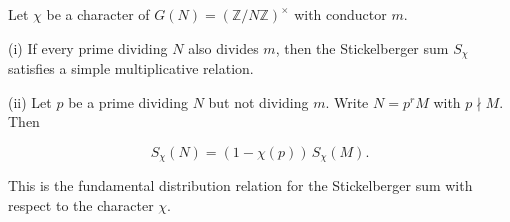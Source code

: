 Let $\chi$ be a character of $G(N) = (\mathbb{Z}/N\mathbb{Z})^\times$ with conductor $m$.

(i) If every prime dividing $N$ also divides $m$, then the Stickelberger sum $S_\chi$ satisfies a simple multiplicative relation.

(ii) Let $p$ be a prime dividing $N$ but not dividing $m$. Write $N = p^r M$ with $p \nmid M$. Then

$$
S_{\chi}(N) = (1 - \chi(p)) \, S_{\chi}(M).
$$

This is the fundamental distribution relation for the Stickelberger sum with respect to the character $\chi$.
